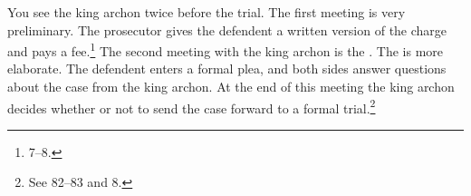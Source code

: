 \documentclass[11pt]{article}
\begin{document}
You see the king archon twice before the trial. The first meeting is very
preliminary. The prosecutor gives the defendent a written version of the
charge and pays a fee.\footnote{\citet{brickhouse2004} 7--8.} The second
meeting with the king archon is the . The
 is more elaborate. The defendent enters a formal plea,
and both sides answer questions about the case from the king archon.  At the
end of this meeting the king archon decides whether or not to send the case
forward to a formal trial.\footnote{See \citet{burnet1924} 82--83 and
\citet{brickhouse2004} 8.}



\end{document}
